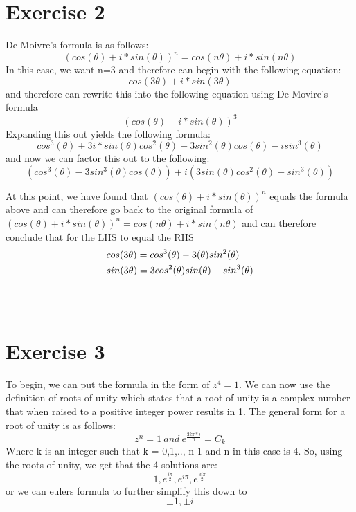 \documentclass[notitlepage]{article}
\begin{document}
 \section*{Exercise 2}

        \hspace{1cm} De Moivre's formula is as follows:
        $$(cos(\theta) + i*sin(\theta))^n=cos(n\theta)+i*sin(n\theta)$$
        In this case, we want n=3 and therefore can begin with the following equation:
        $$cos(3\theta)+i*sin(3\theta)$$
        and therefore can rewrite this into the following equation using De Movire's formula
        $$(cos(\theta)+i*sin(\theta))^3$$
        Expanding this out yields the following formula:
        $$cos^3(\theta)+3i*sin(\theta)cos^2(\theta)-3sin^2(\theta)cos(\theta)-isin^3(\theta)$$
        and now we can factor this out to the following:
        $$(cos^3(\theta)-3sin^3(\theta)cos(\theta)) + i(3sin(\theta)cos^2(\theta)-sin^3(\theta))$$
        
        At this point, we have found that $(cos(\theta)+i*sin(\theta))^n$ equals the formula above 
        and can therefore go back to the original formula of  $(cos(\theta) + i*sin(\theta))^n=cos(n\theta)+i*sin(n\theta)$
        and can therefore conclude that for the LHS to equal the RHS
        \begin{equation}
            \begin{aligned}
                & cos(3\theta) = cos^3(\theta)-3(\theta)sin^2(\theta)\notag\\
                &sin(3\theta) = 3cos^2(\theta)sin(\theta)-sin^3(\theta)
            \end{aligned}
        \end{equation}\\~\\

\section*{Exercise 3}

        \hspace{1cm} To begin, we can put the formula in the form of $z^4 = 1$. We can now use the definition of roots of unity
        which states that a root of unity is a complex number that when raised to a positive 
        integer power results in 1. The general form for a root of unity is as follows:
        $$z^n = 1 \ and\  e^{\frac{2k\pi*i}{n}}=C_k$$
        Where k is an integer such that k = 0,1,.., n-1 and n in this case is 4.
        So, using the roots of unity, we get that the 4 solutions are:
        $$1, e^{\frac{i\pi}{2}}, e^{i\pi}, e^{\frac{3i\pi}{2}}$$
        or we can eulers formula to further simplify this down to
        $$\pm 1, \pm i$$ \\~\\
        
\end{document}
